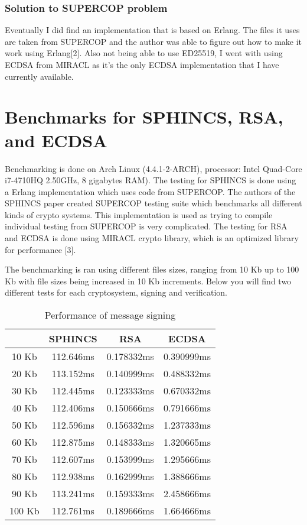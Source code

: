 \documentclass[12pt,a4paper]{article}
\begin{document}
\subsubsection*{Solution to SUPERCOP problem}
Eventually I did find an implementation that is based on Erlang. The files it uses are taken from SUPERCOP and the author was able to figure out how to make it work using Erlang[2]. Also not being able to use ED25519, I went with using ECDSA from MIRACL as it's the only ECDSA implementation that I have currently available.

\section*{Benchmarks for SPHINCS, RSA, and ECDSA}
Benchmarking is done on Arch Linux (4.4.1-2-ARCH), processor: Intel Quad-Core i7-4710HQ 2.50GHz, 8 gigabytes RAM). The testing for SPHINCS is done using a Erlang implementation which uses code from SUPERCOP. The authors of the SPHINCS paper created SUPERCOP testing suite which benchmarks all different kinds of crypto systems. This implementation is used as trying to compile individual testing from SUPERCOP is very complicated. The testing for RSA and ECDSA is done using MIRACL crypto library, which is an optimized library for performance [3].

The benchmarking is ran using different files sizes, ranging from 10 Kb up to 100 Kb with file sizes being increased in 10 Kb increments. Below you will find two different tests for each cryptosystem, signing and verification.

\begin{table} [H]
\centering
\caption{Performance of message signing}
\begin{tabular}{|c|c|c|c|}
\hline 
 & SPHINCS & RSA & ECDSA \\ 
\hline 
10 Kb & 112.646ms & 0.178332ms & 0.390999ms \\ 
\hline 
20 Kb & 113.152ms & 0.140999ms & 0.488332ms \\ 
\hline 
30 Kb & 112.445ms & 0.123333ms & 0.670332ms \\ 
\hline 
40 Kb & 112.406ms & 0.150666ms & 0.791666ms \\ 
\hline 
50 Kb & 112.596ms & 0.156332ms & 1.237333ms \\ 
\hline 
60 Kb & 112.875ms & 0.148333ms & 1.320665ms \\ 
\hline 
70 Kb & 112.607ms & 0.153999ms & 1.295666ms \\ 
\hline 
80 Kb & 112.938ms & 0.162999ms & 1.388666ms \\ 
\hline 
90 Kb & 113.241ms & 0.159333ms & 2.458666ms \\ 
\hline 
100 Kb & 112.761ms & 0.189666ms & 1.664666ms \\ 
\hline 
\end{tabular} 
\end{table}
\end{document}
